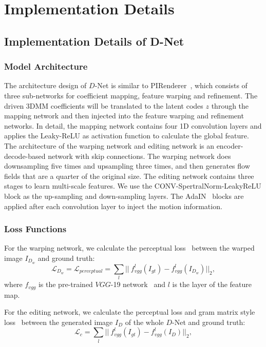 \section{Implementation Details}

\subsection{Implementation Details of D-Net}
\subsubsection{Model Architecture} 
The architecture design of $D$-Net is similar to PIRenderer~\cite{pirender}, which consists of three sub-networks for coefficient mapping, feature warping and refinement. The driven 3DMM coefficients will be translated to the latent codes $z$ through the mapping network and then injected into the feature warping and refinement networks. In detail, the mapping network contains four 1D convolution layers and applies the Leaky-ReLU as activation function to calculate the global feature. The architecture of the warping network and editing network is an encoder-decode-based network with skip connections. 
The warping network does downsampling five times and upsampling three times, and then generates flow fields that are a quarter of the original size. The editing network contains three stages to learn multi-scale features. 
We use the CONV-SpertralNorm-LeakyReLU block as the up-sampling and down-sampling layers. The AdaIN~\cite{huang2017adain} blocks are applied after each convolution layer to inject the motion information.

\subsubsection{Loss Functions} 
For the warping network, we calculate the perceptual loss~\cite{johnson2016perceptual_loss} between the warped image $I_{D_w}$ and ground truth:
\begin{equation}
\mathcal{L}_{D_w} = \mathcal{L}_{perceptual} = \sum_l \vert\vert\ f_{vgg}^l(I_{gt}) - f_{vgg}^l(I_{D_w})\vert\vert_2,
\end{equation}
where $f_{vgg}$ is the pre-trained $VGG$-19 network~\cite{simonyan2014vgg} and $l$ is the layer of the feature map.

For the editing network, we calculate the perceptual loss and gram matrix style loss~\cite{gatys2016image} between the generated image $I_D$ of the whole $D$-Net and ground truth:
\begin{equation}
\mathcal{L}_{c} = \sum_l \vert\vert\ f_{vgg}^l(I_{gt}) - f_{vgg}^l(I_D)\vert\vert_2,
\end{equation}

